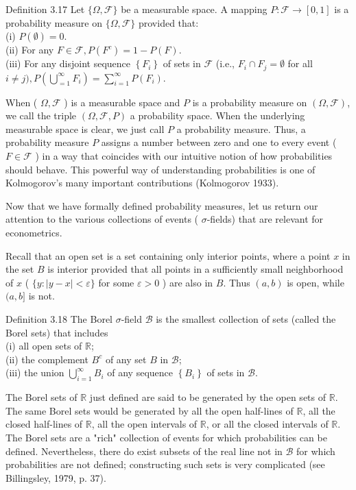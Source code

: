 \documentclass[10pt]{article}
\begin{document}
Definition 3.17 Let $\{\Omega, \mathcal{F}\}$ be a measurable space. A mapping $P: \mathcal{F} \rightarrow [0,1]$ is a probability measure on $\{\Omega, \mathcal{F}\}$ provided that:\\
(i) $P(\emptyset)=0$.\\
(ii) For any $F \in \mathcal{F}, P\left(F^{c}\right)=1-P(F)$.\\
(iii) For any disjoint sequence $\left\{F_{i}\right\}$ of sets in $\mathcal{F}$ (i.e., $F_{i} \cap F_{j}=\emptyset$ for all $i \neq j), P\left(\bigcup_{=1}^{\infty} F_{i}\right)=\sum_{i=1}^{\infty} P\left(F_{i}\right)$.

When ( $\Omega, \mathcal{F}$ ) is a measurable space and $P$ is a probability measure on $(\Omega, \mathcal{F})$, we call the triple $(\Omega, \mathcal{F}, P)$ a probability space. When the underlying measurable space is clear, we just call $P$ a probability measure. Thus, a probability measure $P$ assigns a number between zero and one to every event ( $F \in \mathcal{F}$ ) in a way that coincides with our intuitive notion of how probabilities should behave. This powerful way of understanding probabilities is one of Kolmogorov's many important contributions (Kolmogorov 1933).

Now that we have formally defined probability measures, let us return our attention to the various collections of events ( $\sigma$-fields) that are relevant for econometrics.

Recall that an open set is a set containing only interior points, where a point $x$ in the set $B$ is interior provided that all points in a sufficiently small neighborhood of $x$ ( $\{y:|y-x|<\varepsilon\}$ for some $\varepsilon>0$ ) are also in $B$. Thus $(a, b)$ is open, while $(a, b]$ is not.

Definition 3.18 The Borel $\sigma$-field $\mathcal{B}$ is the smallest collection of sets (called the Borel sets) that includes\\
(i) all open sets of $\mathbb{R}$;\\
(ii) the complement $B^{c}$ of any set $B$ in $\mathcal{B}$;\\
(iii) the union $\bigcup_{i=1}^{\infty} B_{i}$ of any sequence $\left\{B_{i}\right\}$ of sets in $\mathcal{B}$.

The Borel sets of $\mathbb{R}$ just defined are said to be generated by the open sets of $\mathbb{R}$. The same Borel sets would be generated by all the open half-lines of $\mathbb{R}$, all the closed half-lines of $\mathbb{R}$, all the open intervals of $\mathbb{R}$, or all the closed intervals of $\mathbb{R}$. The Borel sets are a "rich" collection of events for which probabilities can be defined. Nevertheless, there do exist subsets of the real line not in $\mathcal{B}$ for which probabilities are not defined; constructing such sets is very complicated (see Billingsley, 1979, p. 37).
\end{document}
